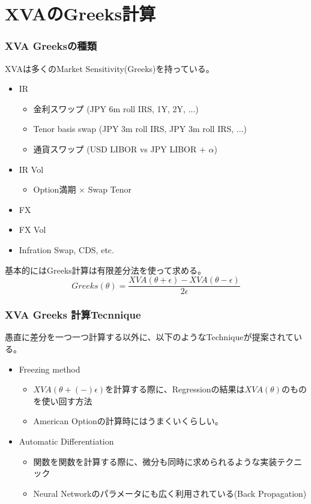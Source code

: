 \documentclass[driverfallback=dvipdfmx,cjk]{beamer}
\begin{document}
\section{XVAのGreeks計算}
\begin{frame}\frametitle{XVA Greeksの種類}
    XVAは多くのMarket Sensitivity(Greeks)を持っている。
    \begin{itemize}
        \item IR
            \begin{itemize}
                \item 金利スワップ (JPY 6m roll IRS, 1Y, 2Y, ...)
                \item Tenor basis swap (JPY 3m roll IRS, JPY 3m roll IRS, ...)
                \item 通貨スワップ (USD LIBOR vs JPY LIBOR + $\alpha$)
            \end{itemize}
        \item IR Vol
            \begin{itemize}
                \item Option満期 $\times$ Swap Tenor
            \end{itemize}
        \item FX 
        \item FX Vol
        \item Infration Swap, CDS, etc.
    \end{itemize}
    基本的にはGreeks計算は有限差分法を使って求める。
    $$Greeks(\theta) = \frac{XVA(\theta+ \epsilon) - XVA(\theta - \epsilon)}{2 \epsilon} $$
\end{frame}

\begin{frame}\frametitle{XVA Greeks 計算Tecnnique}
愚直に差分を一つ一つ計算する以外に、以下のようなTechniqueが提案されている。
\begin{itemize}
    \item Freezing method
        \begin{itemize}
            \item $XVA(\theta +(-) \epsilon)$を計算する際に、Regressionの結果は$XVA(\theta)$のものを使い回す方法
            \item American Optionの計算時にはうまくいくらしい。
        \end{itemize}
    \item Automatic Differentiation
        \begin{itemize}
            \item 関数を関数を計算する際に、微分も同時に求められるような実装テクニック
            \item Neural Networkのパラメータにも広く利用されている(Back Propagation)
        \end{itemize}
\end{itemize}
\end{frame}
\end{document}
